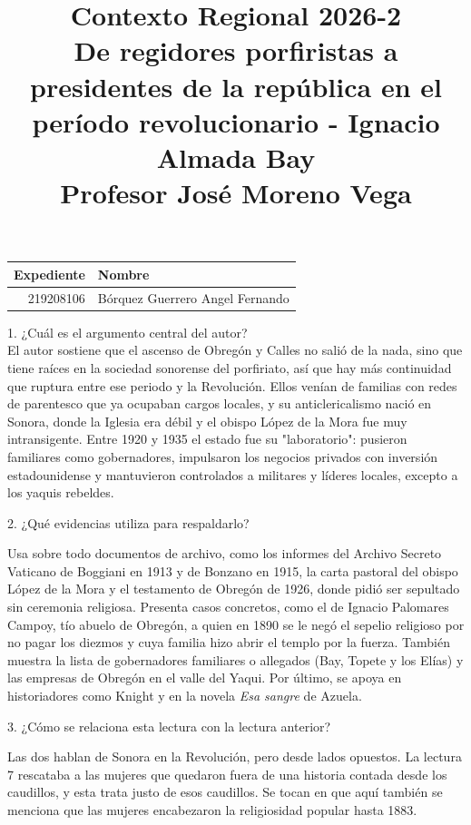 \documentclass[a4paper, 11pt]{article}
\title
{
    Contexto Regional 2026-2 \\
    De regidores porfiristas a presidentes de la república en el período revolucionario - Ignacio Almada Bay \\

    Profesor José Moreno Vega
}
\begin{document}
\begin{otherlanguage}{spanish}
\maketitle
\end{otherlanguage}

\begin{center}
    \begin{tabular}{r|l}
        \textbf{Expediente} & \textbf{Nombre} \\ \hline
        219208106 & Bórquez Guerrero Angel Fernando \\
    \end{tabular}
\end{center}

{\Large 1. ¿Cuál es el argumento central del autor?} \\
{\color{azul}
    El autor sostiene que el ascenso de Obregón y Calles no salió de la nada, sino que tiene raíces en la sociedad sonorense del porfiriato, así que hay más continuidad que ruptura entre ese periodo y la Revolución. Ellos venían de familias con redes de parentesco que ya ocupaban cargos locales, y su anticlericalismo nació en Sonora, donde la Iglesia era débil y el obispo López de la Mora fue muy intransigente. Entre 1920 y 1935 el estado fue su "laboratorio": pusieron familiares como gobernadores, impulsaron los negocios privados con inversión estadounidense y mantuvieron controlados a militares y líderes locales, excepto a los yaquis rebeldes.
}
\vspace{1cm}

{\Large 2. ¿Qué evidencias utiliza para respaldarlo?} \par
{\color{azul}
Usa sobre todo documentos de archivo, como los informes del Archivo Secreto Vaticano de Boggiani en 1913 y de Bonzano en 1915, la carta pastoral del obispo López de la Mora y el testamento de Obregón de 1926, donde pidió ser sepultado sin ceremonia religiosa. Presenta casos concretos, como el de Ignacio Palomares Campoy, tío abuelo de Obregón, a quien en 1890 se le negó el sepelio religioso por no pagar los diezmos y cuya familia hizo abrir el templo por la fuerza. También muestra la lista de gobernadores familiares o allegados (Bay, Topete y los Elías) y las empresas de Obregón en el valle del Yaqui. Por último, se apoya en historiadores como Knight y en la novela \textit{Esa sangre} de Azuela.
}
\vspace{1cm}

{\Large 3. ¿Cómo se relaciona esta lectura con la lectura anterior?} \par
{\color{azul}
Las dos hablan de Sonora en la Revolución, pero desde lados opuestos. La lectura 7 rescataba a las mujeres que quedaron fuera de una historia contada desde los caudillos, y esta trata justo de esos caudillos. Se tocan en que aquí también se menciona que las mujeres encabezaron la religiosidad popular hasta 1883.
}
\end{document}
